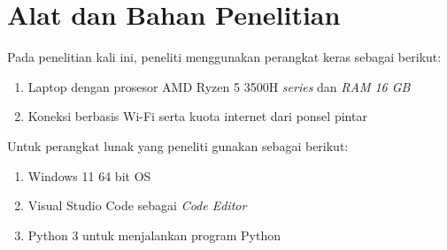 

\pagebreak
\section{Alat dan Bahan Penelitian}
Pada penelitian kali ini, peneliti menggunakan perangkat keras sebagai berikut:
\begin{enumerate}
    \item Laptop dengan prosesor AMD Ryzen 5 3500H \emph{series} dan \emph{RAM 16 GB}
    \item Koneksi berbasis Wi-Fi serta kuota internet dari ponsel pintar
    \end{enumerate}
Untuk perangkat lunak yang peneliti gunakan sebagai berikut:
\begin{enumerate}
    \item Windows 11 64 bit OS
    \item Visual Studio Code sebagai \emph{Code Editor}
    \item Python 3 untuk menjalankan program Python
    \end{enumerate}

